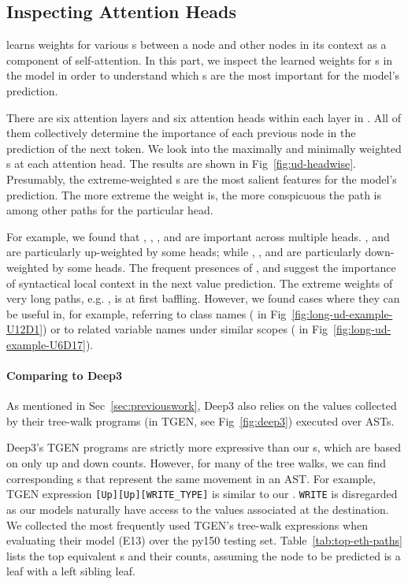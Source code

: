 \documentclass[nonacm, sigconf]{acmart}
\newcommand{\code}[1]{{\texttt{#1}}}
\newcommand{\figref}[1]{Fig~\ref{#1}}
\newcommand{\tabref}[1]{Table~\ref{#1}}
\begin{document}
\subsection{Inspecting Attention Heads}
\label{sec:inspect-attn-heads}
\TreeRel learns weights for various s between a node and other nodes in its context as a component of self-attention.
In this part, we inspect the learned weights for s in the \TreeRel model in order to understand which s are the most important for the model's prediction.

There are six attention layers and six attention heads within each layer in \TreeRel.
All of them collectively determine the importance of each previous node in the prediction of the next token. We look into the maximally and minimally weighted s at each attention head. The results are shown in \figref{fig:ud-headwise}.
Presumably, the extreme-weighted s are the most salient features for the model's prediction.
The more extreme the weight is, the more conspicuous the path is among other paths for the particular head.

For example, we found that , , ,  and  are important across multiple heads.
,  and  are particularly up-weighted by some heads;
while , ,  and  are particularly down-weighted by some heads.
The frequent presences of ,  and  suggest the importance of syntactical local context in the next value prediction. 
The extreme weights of very long paths, e.g. , is at first baffling.
However, we found cases where they can be useful in, for example, referring 
to class names ( in \figref{fig:long-ud-example-U12D1}) or to related variable names under similar scopes ( in \figref{fig:long-ud-example-U6D17}).

\paragraph{Comparing to Deep3}
As mentioned in Sec~\ref{sec:previouswork}, Deep3 also relies on the values collected by their tree-walk programs (in TGEN, see Fig~\ref{fig:deep3}) executed over ASTs.



Deep3's TGEN programs are strictly more expressive than our s, which are based on only up and down counts.
However, for many of the tree walks, we can find corresponding s that represent the same movement in an AST. 
For example, TGEN expression \code{[Up][Up][WRITE\_TYPE]} is similar to our .
\code{WRITE} is disregarded as our models naturally have access to the values associated at the destination.
We collected the most frequently used TGEN's tree-walk expressions when evaluating their model (E13) over the py150 testing set.
\tabref{tab:top-eth-paths} lists the top equivalent s and their counts, assuming the node to be predicted is a leaf with a left sibling leaf.
\end{document}

